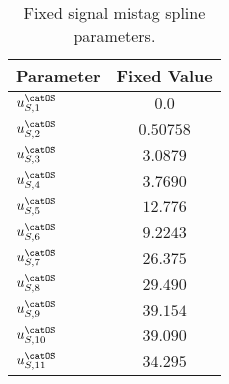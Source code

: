 \begin{table}[h]
\caption{Fixed signal \OS mistag spline parameters.}
\label{tab:app:measurement_of_sin2beta:cpv_measurement:fixed_parameters:eta:sig:os}
\centering
\begin{tabular}{lr@{$\,\pm\,$}l}
  \toprule
  Parameter                & \multicolumn{2}{c}{Fixed Value} \\
  \midrule
  $u_{S,1}^\text{\catOS}$  & \multicolumn{2}{c}{$0.0$}\\
  $u_{S,2}^\text{\catOS}$  & \multicolumn{2}{c}{$0.50758$}\\
  $u_{S,3}^\text{\catOS}$  & \multicolumn{2}{c}{$3.0879$}\\
  $u_{S,4}^\text{\catOS}$  & \multicolumn{2}{c}{$3.7690$}\\
  $u_{S,5}^\text{\catOS}$  & \multicolumn{2}{c}{$12.776$}\\
  $u_{S,6}^\text{\catOS}$  & \multicolumn{2}{c}{$9.2243$}\\
  $u_{S,7}^\text{\catOS}$  & \multicolumn{2}{c}{$26.375$}\\
  $u_{S,8}^\text{\catOS}$  & \multicolumn{2}{c}{$29.490$}\\
  $u_{S,9}^\text{\catOS}$  & \multicolumn{2}{c}{$39.154$}\\
  $u_{S,10}^\text{\catOS}$ & \multicolumn{2}{c}{$39.090$}\\
  $u_{S,11}^\text{\catOS}$ & \multicolumn{2}{c}{$34.295$}\\
  \bottomrule
\end{tabular}
\end{table}
%

